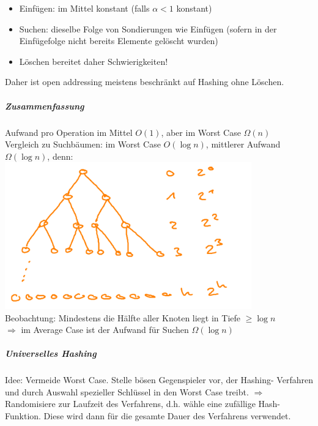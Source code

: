 \documentclass[fleqn]{scrartcl}
\begin{document}
\begin{itemize}
\item Einfügen: im Mittel konstant (falls $\alpha < 1$ konstant)
\item Suchen: dieselbe Folge von Sondierungen wie Einfügen (sofern in der Einfügefolge nicht bereits Elemente gelöscht wurden)
\item Löschen bereitet daher Schwierigkeiten!
\end{itemize}

Daher ist open addressing meistens beschränkt auf Hashing ohne Löschen.

\subparagraph{Zusammenfassung}
Aufwand pro Operation im Mittel $O(1)$, aber im Worst Case $\Omega(n)$\\
Vergleich zu Suchbäumen: im Worst Case $O(\log n)$, mittlerer Aufwand $\Omega (\log n)$, denn:\\
\includegraphics[width=0.8\textwidth]{./SuchbaumHoehe}\\
Beobachtung: Mindestens die Hälfte aller Knoten liegt in Tiefe $\geq \log n$\\
$ \Rightarrow $ im Average Case ist der Aufwand für Suchen $\Omega (\log n)$

\subparagraph{Universelles Hashing}
Idee: Vermeide Worst Case. Stelle bösen Gegenspieler vor, der Hashing- Verfahren und durch Auswahl spezieller Schlüssel in den Worst Case treibt. $\Rightarrow$ Randomisiere zur Laufzeit des Verfahrens, d.h. wähle eine zufällige Hash- Funktion. Diese wird dann für die gesamte Dauer des Verfahrens verwendet.
 \\ 
\end{document}
